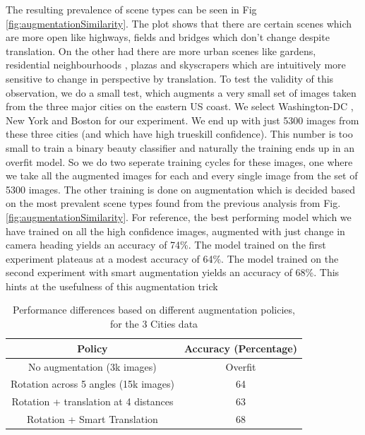 The resulting prevalence of scene types can be seen in Fig \ref{fig:augmentationSimilarity}. The plot shows that there are certain scenes which are more open like highways, fields and bridges which don't change despite translation. On the other had there are more urban scenes like gardens, residential neighbourhoods , plazas and skyscrapers which are intuitively more sensitive to change in perspective by translation. 
To test the validity of this observation, we do a small test, which augments a very small set of images taken from the three major cities on the eastern US coast. We select Washington-DC , New York and Boston for our experiment. We end up with just 5300 images from these three cities (and which have high trueskill confidence). This number is too small to train a binary beauty classifier and naturally the training ends up in an overfit model. So we do two seperate training cycles for these images, one where we take all the augmented images for each and every single image from the set of 5300 images. The other training is done on augmentation which is decided based on the most prevalent scene types found from the previous analysis from Fig. \ref{fig:augmentationSimilarity}. For reference, the best performing model which we have trained on all the high confidence images, augmented with just change in camera heading yields an accuracy of 74\%. The model trained on the first experiment plateaus at a modest accuracy of 64\%. The model trained on the second experiment with smart augmentation yields an accuracy of 68\%. This hints at the usefulness of this augmentation trick


\begin{table}[h]
	\centering
	\begin{tabular}{|c|c|}
		\hline
		\textbf{Policy} & \textbf{Accuracy (Percentage)}\\
		\hline
		No augmentation (3k images)  & Overfit \\
		\hline
		Rotation across 5 angles (15k images) & 64 \\
		\hline
		Rotation + translation at 4 distances  & 63 \\
		\hline
		Rotation + Smart Translation & 68 \\
		\hline
		
		\hline
	\end{tabular}
	\caption{Performance differences based on different augmentation policies, for the 3 Cities data}
	\label{tab:augmentation}
\end{table}


